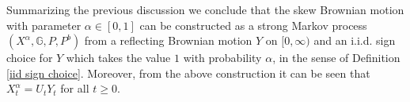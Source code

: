 \documentclass[reqno]{amsart}
\theoremstyle{definition}
\theoremstyle{remark}
\numberwithin{equation}{section}
\begin{document}
Summarizing the previous discussion we conclude that the skew Brownian motion with parameter $\alpha\in[0,1]$ can be constructed as a strong Markov process $(X^\alpha, \mathbb{G},P,P^b)$ from a reflecting Brownian motion $Y$ on $[0,\infty)$ and an i.i.d. sign choice for $Y$ which takes the value $1$ with probability $\alpha$, in the sense of Definition \ref{iid sign choice}. Moreover, from the above construction it can be seen that $X^\alpha_t=U_tY_t$ for all $t\ge 0$.
\end{document}
